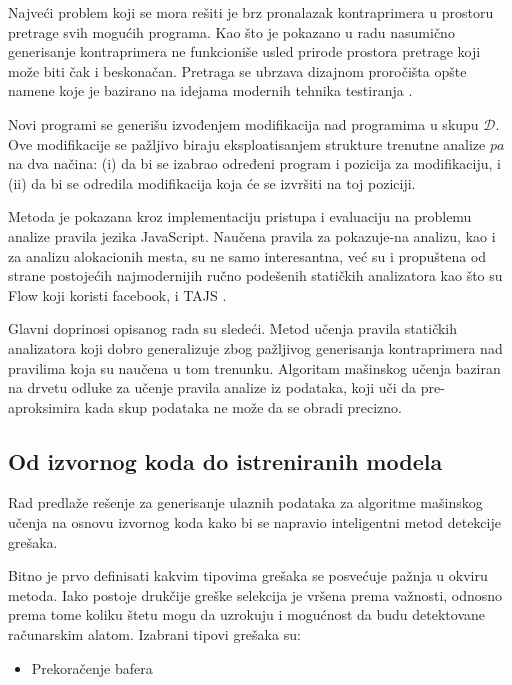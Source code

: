 \documentclass[a4paper]{article}
\theoremstyle{definition}
\begin{document}
{Najveći problem koji se mora rešiti je brz pronalazak kontraprimera u prostoru 
pretrage svih mogućih programa. Kao što je pokazano u radu \cite{staticAnalyzer} 
nasumično generisanje kontraprimera ne funkcioniše usled prirode prostora 
pretrage koji može biti čak i beskonačan. Pretraga se ubrzava dizajnom 
proročišta opšte namene koje je bazirano na idejama modernih tehnika testiranja 
\cite{testing}. 

Novi programi se generišu izvođenjem modifikacija nad programima u skupu 
$\mathcal{D}$. Ove modifikacije se pažljivo biraju eksploatisanjem strukture 
trenutne analize $pa$ na dva načina: (i) da bi se izabrao određeni program i 
pozicija za modifikaciju, i (ii) da bi se odredila modifikacija koja će se 
izvršiti na toj poziciji.


Metoda je pokazana kroz implementaciju pristupa i evaluaciju na problemu analize 
pravila jezika JavaScript. Naučena pravila za pokazuje-na analizu, kao i za 
analizu alokacionih mesta, su ne samo interesantna, već su i propuštena od 
strane postojećih najmodernijih ručno podešenih statičkih analizatora kao što 
su Flow \cite{flow} koji koristi facebook, i TAJS \cite{tajs}.

Glavni doprinosi opisanog rada su sledeći. Metod učenja pravila statičkih 
analizatora koji dobro generalizuje zbog pažljivog generisanja kontraprimera 
nad pravilima koja su naučena u tom trenunku. Algoritam mašinskog učenja baziran 
na drvetu odluke za učenje pravila analize iz podataka, koji uči da 
pre-aproksimira kada skup podataka ne može da se obradi precizno. 

\subsection{Od izvornog koda do istreniranih modela}
\label{subsec:pregled}

Rad \cite{staticFeatures} predlaže rešenje za generisanje ulaznih podataka za algoritme mašinskog učenja na osnovu
izvornog koda kako bi se napravio inteligentni metod detekcije grešaka.

Bitno je prvo definisati kakvim tipovima grešaka se posvećuje pažnja u okviru metoda.
Iako postoje drukčije greške selekcija je vršena prema važnosti, odnosno prema tome
koliku štetu mogu da uzrokuju i mogućnost da budu detektovane računarskim alatom. Izabrani tipovi grešaka su:

\begin{itemize}
\item Prekoračenje bafera


\end{itemize}}
\end{document}
